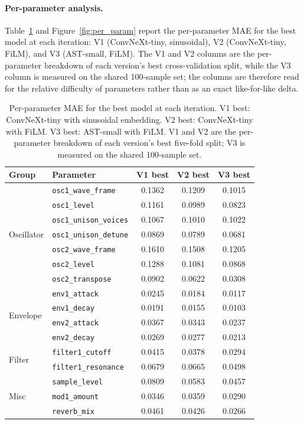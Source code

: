 \paragraph{Per-parameter analysis.}
Table~\ref{tab:per_param} and Figure~\ref{fig:per_param} report the per-parameter MAE for the best model at each iteration: V1 (ConvNeXt-tiny, sinusoidal), V2 (ConvNeXt-tiny, FiLM), and V3 (AST-small, FiLM). The V1 and V2 columns are the per-parameter breakdown of each version's best cross-validation split, while the V3 column is measured on the shared 100-sample set; the columns are therefore read for the relative difficulty of parameters rather than as an exact like-for-like delta.

\begin{table}[H]
\centering
\renewcommand{\arraystretch}{1.25}
\begin{tabular}{llccc}
\hline
\textbf{Group} & \textbf{Parameter} & \textbf{V1 best} & \textbf{V2 best} & \textbf{V3 best} \\
\hline
\multirow{7}{*}{Oscillator}
  & \texttt{osc1\_wave\_frame}    & 0.1362 & 0.1209 & 0.1015 \\
  & \texttt{osc1\_level}          & 0.1161 & 0.0989 & 0.0823 \\
  & \texttt{osc1\_unison\_voices} & 0.1067 & 0.1010 & 0.1022 \\
  & \texttt{osc1\_unison\_detune} & 0.0869 & 0.0789 & 0.0681 \\
  & \texttt{osc2\_wave\_frame}    & 0.1610 & 0.1508 & 0.1205 \\
  & \texttt{osc2\_level}          & 0.1288 & 0.1081 & 0.0868 \\
  & \texttt{osc2\_transpose}      & 0.0902 & 0.0622 & 0.0308 \\
\hline
\multirow{4}{*}{Envelope}
  & \texttt{env1\_attack}         & 0.0245 & 0.0184 & 0.0117 \\
  & \texttt{env1\_decay}          & 0.0191 & 0.0155 & 0.0103 \\
  & \texttt{env2\_attack}         & 0.0367 & 0.0343 & 0.0237 \\
  & \texttt{env2\_decay}          & 0.0269 & 0.0277 & 0.0213 \\
\hline
\multirow{2}{*}{Filter}
  & \texttt{filter1\_cutoff}      & 0.0415 & 0.0378 & 0.0294 \\
  & \texttt{filter1\_resonance}   & 0.0679 & 0.0665 & 0.0498 \\
\hline
\multirow{3}{*}{Misc}
  & \texttt{sample\_level}        & 0.0809 & 0.0583 & 0.0457 \\
  & \texttt{mod1\_amount}         & 0.0346 & 0.0359 & 0.0290 \\
  & \texttt{reverb\_mix}          & 0.0461 & 0.0426 & 0.0266 \\
\hline
\end{tabular}
\vspace{0.3cm}
\caption{Per-parameter MAE for the best model at each iteration. V1 best: ConvNeXt-tiny with sinusoidal embedding. V2 best: ConvNeXt-tiny with FiLM. V3 best: AST-small with FiLM. V1 and V2 are the per-parameter breakdown of each version's best five-fold split; V3 is measured on the shared 100-sample set.}
\label{tab:per_param}
\end{table}

